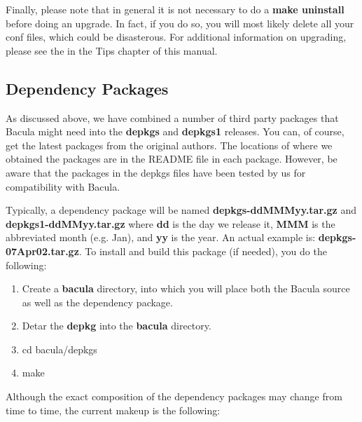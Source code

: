 Finally, please note that in general it is not necessary to do a 
{\bf make uninstall} before doing an upgrade. In fact, if you do so, you will 
most likely delete all your conf files, which could be disasterous.
For additional information on upgrading, please see the  in the Tips chapter of this manual.


\subsection*{Dependency Packages}
\label{Dependency}

As discussed above, we have combined a number of third party packages that
Bacula might need into the {\bf depkgs} and {\bf depkgs1} releases. You can,
of course, get the latest packages from the original authors. The locations of
where we obtained the packages are in the README file in each package.
However, be aware that the packages in the depkgs files have been tested by us
for compatibility with Bacula. 

Typically, a dependency package will be named {\bf depkgs-ddMMMyy.tar.gz} and
{\bf depkgs1-ddMMyy.tar.gz} where {\bf dd} is the day we release it, {\bf MMM}
is the abbreviated month (e.g. Jan), and {\bf yy} is the year. An actual
example is: {\bf depkgs-07Apr02.tar.gz}. To install and build this package (if
needed), you do the following: 

\begin{enumerate}
\item Create a {\bf bacula} directory, into which you will place  both the
   Bacula source as well as the dependency package.  
\item Detar the {\bf depkg} into the {\bf bacula} directory.  
\item cd bacula/depkgs  
\item make 
   \end{enumerate}

Although the exact composition of the dependency packages may change from time
to time, the current makeup is the following: 

